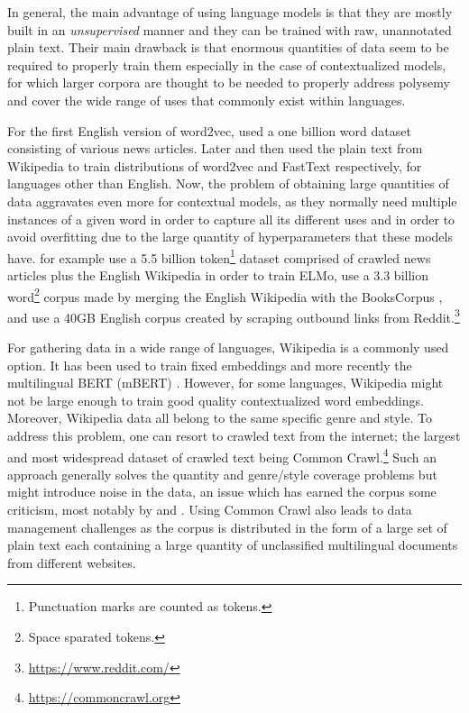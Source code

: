 In general, the main advantage of using language models is that they are mostly built in an \emph{unsupervised} manner and they can be trained with raw, unannotated plain text. Their main drawback is that enormous quantities of data seem to be required to properly train them especially in the case of contextualized models, for which larger corpora are thought to be needed to properly address polysemy and cover the wide range of uses that commonly exist within languages.

For the first English version of word2vec, \citet{mikolov-etal-2013-distributed} used a one billion word dataset consisting of various news articles. Later \citet{al-rfou-etal-2013-polyglot} and then \citet{bojanowski-etal-2017-enriching} used the plain text from Wikipedia to train distributions of word2vec and FastText respectively, for languages other than English. Now, the problem of obtaining large quantities of data aggravates even more for contextual models, as they normally need multiple instances of a given word in order to capture all its different uses and in order to avoid overfitting due to the large quantity of hyperparameters that these models have. \citet{peters-etal-2018-deep} for example use a 5.5 billion token\footnote{Punctuation marks are counted as tokens.} dataset comprised of crawled news articles plus the English Wikipedia in order to train ELMo, \citet{devlin-etal-2019-bert} use a 3.3 billion word\footnote{Space sparated tokens.} corpus made by merging the English Wikipedia with the BooksCorpus \citep{zhu-etal-2015-aligning}, and \citet{radford-etal-2019-language} use a 40GB English corpus created by scraping outbound links from Reddit.\footnote{\url{https://www.reddit.com/}}

For gathering data in a wide range of languages, Wikipedia is a commonly used option. It has been used to train fixed embeddings \citep{al-rfou-etal-2013-polyglot,bojanowski-etal-2017-enriching} and more recently the multilingual BERT (mBERT) \citep{devlin-etal-2019-bert}. However, for some languages, Wikipedia might not be large enough to train good quality contextualized word embeddings. Moreover, Wikipedia data all belong to the same specific genre and style. To address this problem, one can resort to crawled text from the internet; the largest and most widespread dataset of crawled text being Common Crawl.\footnote{\url{https://commoncrawl.org}} Such an approach generally solves the quantity and genre/style coverage problems but might introduce noise in the data, an issue which has earned the corpus some criticism, most notably by \citet{trinh-le-2018-a} and \citet{radford-etal-2019-language}. Using Common Crawl also leads to data management challenges as the corpus is distributed in the form of a large set of plain text each containing a large quantity of unclassified multilingual documents from different websites.

